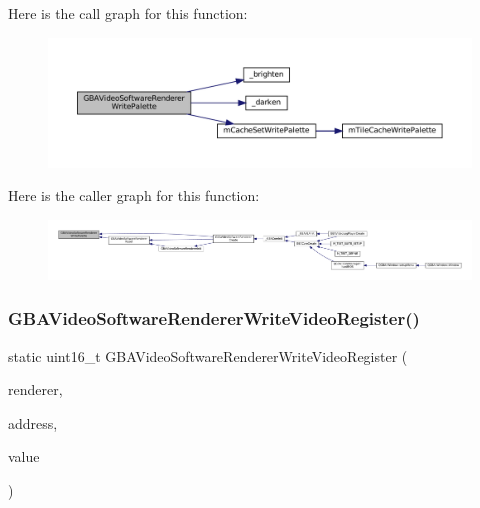 Here is the call graph for this function\+:
\nopagebreak
\begin{figure}[H]
\begin{center}
\leavevmode
\includegraphics[width=350pt]{video-software_8c_acc8c3b30451a006f57fbfd75bc9582b7_cgraph}
\end{center}
\end{figure}
Here is the caller graph for this function\+:
\nopagebreak
\begin{figure}[H]
\begin{center}
\leavevmode
\includegraphics[width=350pt]{video-software_8c_acc8c3b30451a006f57fbfd75bc9582b7_icgraph}
\end{center}
\end{figure}
\mbox{\label{video-software_8c_abf56bee96b521193690fc647929cd43b}} 
\subsubsection{\texorpdfstring{G\+B\+A\+Video\+Software\+Renderer\+Write\+Video\+Register()}{GBAVideoSoftwareRendererWriteVideoRegister()}}
{\footnotesize\ttfamily static uint16\+\_\+t G\+B\+A\+Video\+Software\+Renderer\+Write\+Video\+Register (\begin{DoxyParamCaption}\item[{struct G\+B\+A\+Video\+Renderer $\ast$}]{renderer,  }\item[{uint32\+\_\+t}]{address,  }\item[{uint16\+\_\+t}]{value }\end{DoxyParamCaption})\hspace{0.3cm}{\ttfamily [static]}}

